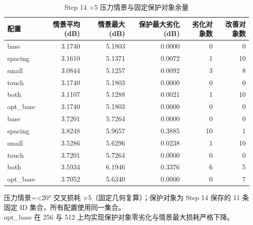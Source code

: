 \begin{table}[htbp]
  \centering
  \caption{Step 14 ×5 压力情景与固定保护对象余量}
  \label{tab:step14-scenario}
  \begin{tabular}{lrrrrr}
    \toprule
    配置 & 情景平均 (dB) & 情景最大 (dB) & 保护最大劣化 (dB) & 劣化对象数 & 改善对象数 \\
    \midrule
    base & 3.1740 & 5.1803 & 0.0000 & 0 & 0 \\
    spacing & 3.1610 & 5.1371 & 0.0072 & 1 & 10 \\
    small & 3.0844 & 5.1257 & 0.0092 & 3 & 8 \\
    touch & 3.1740 & 5.1803 & 0.0000 & 0 & 0 \\
    both & 3.1107 & 5.1288 & 0.0021 & 1 & 10 \\
    opt\_base & 3.1740 & 5.1803 & 0.0000 & 0 & 0 \\
    \midrule
    base & 3.7201 & 5.7264 & 0.0000 & 0 & 0 \\
    spacing & 3.8248 & 5.9657 & 0.3885 & 10 & 1 \\
    small & 3.5286 & 5.6296 & 0.0238 & 1 & 10 \\
    touch & 3.7201 & 5.7264 & 0.0000 & 0 & 0 \\
    both & 3.5934 & 6.1946 & 0.3376 & 6 & 5 \\
    opt\_base & 3.7052 & 5.6340 & 0.0000 & 0 & 7 \\
    \bottomrule
  \end{tabular}
  \par\vspace{2pt}
  \begin{flushleft}\footnotesize
  压力情景=<20° 交叉损耗 ×5（固定几何复算）；保护对象为 Step 14 保存的 11 条固定 ID 集合，所有配置使用同一集合。 \\
  opt\_base 在 256 与 512 上均实现保护对象零劣化与情景最大损耗严格下降。 \\
  \end{flushleft}
\end{table}

